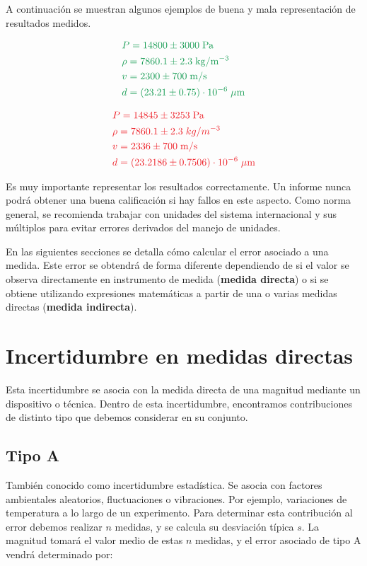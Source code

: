 \documentclass{book}
\begin{document}
A continuación se muestran algunos ejemplos de buena y mala representación de resultados medidos.

\begin{equation}
  \begin{aligned}
    & \color{ForestGreen} P = 14800 \pm 3000 \; \mathrm{Pa} \\
    & \color{ForestGreen} \rho = 7860.1 \pm 2.3 \; \mathrm{kg / m^{-3}} \\
    & \color{ForestGreen} v = 2300 \pm 700 \; \mathrm{m/s} \\
    & \color {ForestGreen} d = ( 23.21 \pm 0.75 ) \cdot 10^{-6} \; \mathrm{\mu m}
  \end{aligned}
\end{equation}

\begin{equation}
  \begin{aligned}
    & \color{Red} P = 14845 \pm 3253 \; \mathrm{Pa} \\
    & \color{Red} \rho = 7860.1 \pm 2.3 \; kg / m^{-3} \\
    & \color{Red} v = 2336 \pm 700 \; \mathrm{m/s} \\
    & \color {Red} d = ( 23.2186 \pm 0.7506 ) \cdot 10^{-6} \; \mathrm{\mu m}
  \end{aligned}
\end{equation}


Es muy importante representar los resultados correctamente. Un informe nunca podrá obtener una
buena calificación si hay fallos en este aspecto. Como norma general, se recomienda trabajar con
unidades del sistema internacional y sus múltiplos para evitar errores derivados del manejo de
unidades.

En las siguientes secciones se detalla cómo calcular el error asociado a una medida. 
Este error se obtendrá de forma diferente dependiendo de si el valor se observa directamente en
instrumento de medida (\textbf{medida directa}) o si se obtiene utilizando expresiones matemáticas a partir
de una o varias medidas directas (\textbf{medida indirecta}).


\section{Incertidumbre en medidas directas}
Esta incertidumbre se asocia con la medida directa de una magnitud mediante un dispositivo o técnica.
Dentro de esta incertidumbre, encontramos contribuciones de distinto tipo que debemos considerar
en su conjunto.
\subsection{Tipo A}
También conocido como incertidumbre estadística. Se asocia con factores ambientales aleatorios, 
fluctuaciones o vibraciones. Por ejemplo, variaciones de temperatura a lo largo de un experimento.
Para determinar esta contribución al error debemos realizar $n$ medidas, y se calcula su desviación
típica $s$. La magnitud tomará el valor medio de estas $n$ medidas, y el error asociado de tipo A 
vendrá determinado por:
\end{document}

